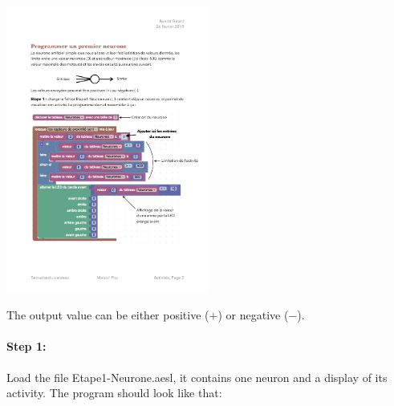 \documentclass[12pt]{article}
\newcommand{\firstfile}{Etape1-Neurone.aesl}
\begin{document}
\begin{center}
\includegraphics[width=0.5\textwidth]{../SchemaNeuroneArtificiel.pdf}
\end{center}

The output value can be either positive ($+$) or negative ($-$).

\paragraph{Step 1:} Load the file \firstfile, it contains one neuron and a display of its activity. The program should look like that:
\end{document}
